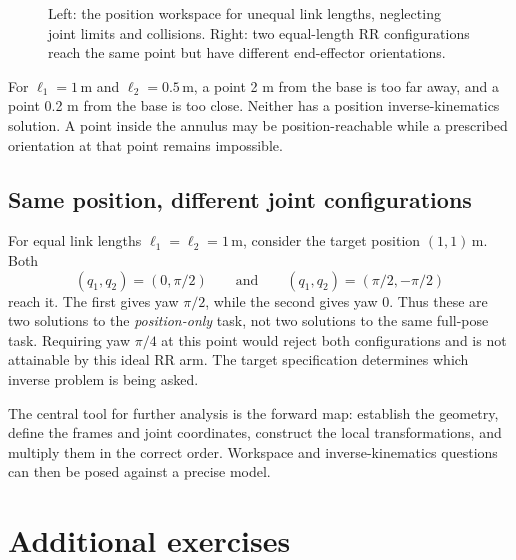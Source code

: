 \begin{figure}[htbp]
\centering
\caption{Left: the position workspace for unequal link lengths, neglecting
joint limits and collisions. Right: two equal-length RR configurations
reach the same point but have different end-effector orientations.}
\label{fig:l10-workspace}
\end{figure}

For $\ell_1=1\,\mathrm m$ and $\ell_2=0.5\,\mathrm m$, a point 2 m
from the base is too far away, and a point 0.2 m from the base is too close.
Neither has a position inverse-kinematics solution. A point inside the
annulus may be position-reachable while a prescribed orientation at that
point remains impossible.

\subsection{Same position, different joint configurations}
For equal link lengths $\ell_1=\ell_2=1\,\mathrm m$, consider the target
position $(1,1)\,\mathrm m$. Both
\[
 (q_1,q_2)=(0,\pi/2)\qquad\text{and}\qquad
 (q_1,q_2)=(\pi/2,-\pi/2)
\]
reach it. The first gives yaw $\pi/2$, while the second gives yaw 0.
Thus these are two solutions to the \emph{position-only} task, not two
solutions to the same full-pose task. Requiring yaw $\pi/4$ at this point
would reject both configurations and is not attainable by this ideal RR
arm. The target specification determines which inverse problem is being
asked.

The central tool for further analysis is the forward map: establish the
geometry, define the frames and joint coordinates, construct the local
transformations, and multiply them in the correct order. Workspace and
inverse-kinematics questions can then be posed against a precise model.




\clearpage
\section{Additional exercises}
